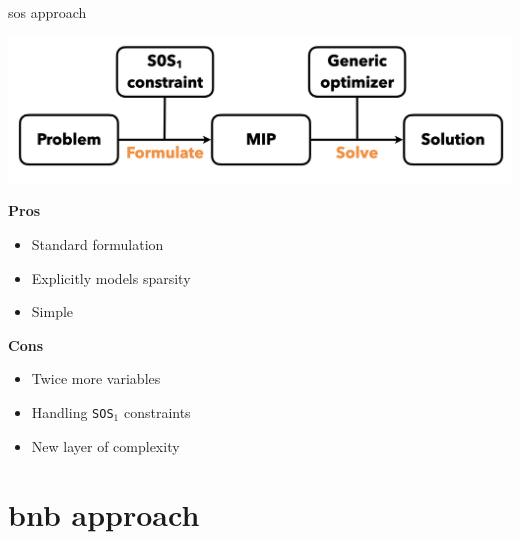 \documentclass[10pt]{beamer}
\begin{document}
\begin{frame}{\gls{sos} approach}
  \begin{center}
    \includegraphics[width=\linewidth]{Illustrations/Illustrations.005.png}
  \end{center}
  \pause
  \begin{minipage}[t]{0.49\linewidth}
    \textbf{Pros}
    \begin{itemize}
      \item[\ding{51}] Standard formulation 
      \item[\ding{51}] Explicitly models sparsity
      \item[\ding{51}] Simple
    \end{itemize}
  \end{minipage}
  \hfill
  \pause
  \begin{minipage}[t]{0.49\linewidth}
    \textbf{Cons}
    \begin{itemize}
      \item[\ding{55}] Twice more variables
      \item[\ding{55}] Handling \texttt{SOS}${}_1$ constraints
      \item[\ding{55}] New layer of complexity
    \end{itemize}
  \end{minipage}
\end{frame}

\section{\gls{bnb} approach}
\end{document}
